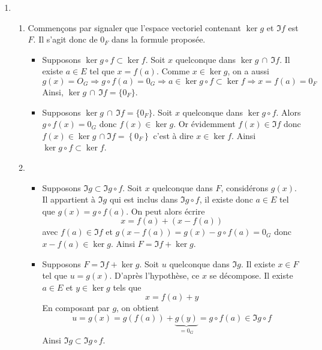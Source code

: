 \begin{enumerate}
 \item
\begin{enumerate}
 \item Commençons par signaler que l'espace vectoriel contenant $\ker g $ et $\Im f$ est $F$. Il s'agit donc de $0_F$ dans la formule proposée.
\begin{itemize}
 \item Supposons $\ker g\circ f \subset \ker f$. Soit $x$ quelconque dans $\ker g \,\cap\, \Im f$. Il existe $a\in E$ tel que $x=f(a)$. Comme $x\in \ker g$, on a aussi
\begin{displaymath}
 g(x)=O_G \Rightarrow g\circ f(a) =0_G \Rightarrow a\in \ker g\circ f \subset \ker f
\Rightarrow x=f(a)=0_F
\end{displaymath}
Ainsi, $\ker g \,\cap\, \Im f=\{0_F\}$.
\item Supposons $\ker g \,\cap\, \Im f=\{0_F\}$. Soit $x$ quelconque dans $\ker g \circ f$. Alors $g\circ f(x)=0_G$ donc $f(x)\in \ker g$. Or évidemment $f(x)\in \Im f$ donc $f(x)\in \ker g \,\cap \Im f = \left\lbrace 0_F\right\rbrace $ c'est à dire $x\in \ker f$.\newline
Ainsi $\ker g \circ f \subset \ker f$.
\end{itemize}

 \item
\begin{itemize}
 \item Supposons $\Im g \subset \Im g\circ f$. Soit $x$ quelconque dans $F$, considérons $g(x)$. Il appartient à $\Im g$ qui est inclus dans $\Im g\circ f$, il existe donc $a\in E$ tel que $g(x)=g\circ f(a)$. On peut alors écrire
\begin{displaymath}
 x = f(a) + (x-f(a))
\end{displaymath}
avec $f(a)\in \Im f$ et $g(x-f(a))=g(x)-g\circ f(a)=0_G$ donc $x-f(a)\in \ker g$.\newline
Ainsi $F=\Im f + \ker g$.
 \item Supposons $F=\Im f + \ker g$. Soit $u$ quelconque dans $\Im g$. Il existe $x\in F$ tel que $u=g(x)$. D'après l'hypothèse, ce $x$ se décompose. Il existe $a\in E$ et $y\in \ker g$ tels que
\begin{displaymath}
 x= f(a)+y
\end{displaymath}
En composant par $g$, on obtient
\begin{displaymath}
 u=g(x) = g(f(a)) + \underset{=0_G}{\underbrace{g(y)}} = g\circ f(a) \in \Im g\circ f
\end{displaymath}
Ainsi $\Im g \subset \Im g\circ f$.
\end{itemize}
\end{enumerate}
 

\end{enumerate}
